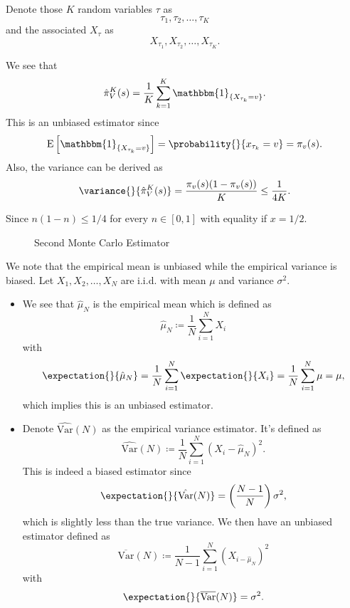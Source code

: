 Denote those \(K\) random variables \(\tau\) as
\[
	\tau_1, \tau_2, \ldots , \tau_K
\]
and the associated \(X_{\tau}\) as
\[
	X_{\tau_1}, X_{\tau_2}, \ldots , X_{\tau_K}.
\]

We see that
\[
	\hat{\pi}_V^K(s) = \frac{1}{K}\sum\limits_{k=1}^{K} \mathbbm{1}_{\{X_{\tau_k} = v\}}.
\]
This is an unbiased estimator since
\[
	\mathrm{E}\left[\mathbbm{1}_{\{X_{\tau_k}=v\}}\right] = \probability{}{x_{\tau_k} = v} = \pi_v(s).
\]
Also, the variance can be derived as
\[
	\variance{}{\hat{\pi}_V^K(s)} = \frac{\pi_v(s)(1 - \pi_v(s))}{K}\leq \frac{1}{4K}.
\]

\begin{remark}
	Since \(n(1-n)\leq 1/4\) for every \(n\in[0, 1]\) with equality if \(x = 1/2\).
\end{remark}

\begin{figure}[H]
	\centering
	\caption{Second Monte Carlo Estimator}
	\label{fig:Monte-Carlo-Estimator-2}
\end{figure}


\hr

\begin{note}
	We note that the empirical mean is unbiased while the empirical variance is biased. Let \(X_1, X_2, \ldots  ,X_N\) are i.i.d. with mean \(\mu\) and variance \(\sigma^2\).
	\begin{itemize}
		\item We see that \(\hat{\mu}_N\) is the empirical mean which is defined as
		      \[
			      \hat{\mu}_N \coloneqq  \frac{1}{N}\sum\limits_{i=1}^{N} X_i
		      \]
		      with
		      \[
			      \expectation{}{\hat{\mu}_N} = \frac{1}{N}\sum\limits_{i=1}^{N} \expectation{}{X_i} = \frac{1}{N}\sum\limits_{i=1}^{N} \mu = \mu,
		      \]
		      which implies this is an unbiased estimator.
		\item Denote \(\hat{\mathrm{Var}}(N)\) as the empirical variance estimator. It's defined as
		      \[
			      \hat{\mathrm{Var}}(N) \coloneqq \frac{1}{N}\sum\limits_{i=1}^{N} (X_i - \hat{\mu}_N)^2.
		      \]
		      This is indeed a biased estimator since
		      \[
			      \expectation{}{\hat{\mathrm{Var}}(N)} = \left(\frac{N-1}{N}\right) \sigma^2,
		      \]
		      which is slightly less than the true variance. We then have an unbiased estimator defined as
		      \[
			      \overline{\mathrm{Var}}(N) \coloneqq  \frac{1}{N-1}\sum\limits_{i=1}^{N} (X_{i-\hat{\mu}_N})^2
		      \]
		      with
		      \[
			      \expectation{}{\overline{\mathrm{Var}}(N)} = \sigma^2.
		      \]
	\end{itemize}
\end{note}

